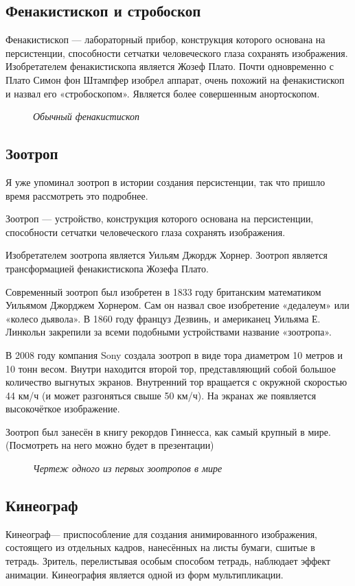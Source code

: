 \documentclass[a4paper, 12pt]{article}
\newcommand{\image}[3]{
	\begin{figure}[ht]
		\center{\texttt{[image: img/\#1]} }
		\caption{\textit{#3}}\end{figure}
}
\begin{document}
\subsection{Фенакистископ и стробоскоп}
Фенакистископ — лабораторный прибор, конструкция которого
основана на персистенции, способности сетчатки человеческого глаза
сохранять изображения. Изобретателем фенакистископа является Жозеф
Плато. Почти одновременно с Плато Симон фон Штампфер изобрел аппарат,
очень похожий на фенакистископ и назвал его «стробоскопом». Является
более совершенным анортоскопом.

\image{Фенакистископ.jpg}{172}{Обычный фенакистископ}

\subsection{Зоотроп}
Я уже упоминал зоотроп в истории создания персистенции, так что
пришло время рассмотреть это подробнее.

Зоотроп — устройство, конструкция которого основана на персистенции,
способности сетчатки человеческого глаза сохранять изображения.


Изобретателем зоотропа является Уильям Джордж Хорнер. Зоотроп является
трансформацией фенакистископа Жозефа Плато.


Современный зоотроп был изобретен в 1833 году британским математиком
Уильямом Джорджем Хорнером. Сам он назвал свое изобретение «дедалеум»
или «колесо дьявола». В 1860 году француз Дезвинь, и американец Уильяма Е.
Линкольн закрепили за всеми подобными устройствами название «зоотропа».


В 2008 году компания Sony создала зоотроп в виде тора диаметром 10 метров
и 10 тонн весом. Внутри находится второй тор, представляющий собой
большое количество выгнутых экранов. Внутренний тор вращается с
окружной скоростью 44 км/ч (и может разгоняться свыше 50 км/ч). На экранах
же появляется высокочёткое изображение.


Зоотроп был занесён в книгу рекордов Гиннесса, как самый крупный в мире.
(Посмотреть на него можно будет в презентации)

\image{зоотроп.jpg}{172}{Чертеж одного из первых зоотропов в мире}

\newpage

\subsection{Кинеограф}

Кинеограф— приспособление для создания анимированного
изображения, состоящего из отдельных кадров, нанесённых на листы бумаги,
сшитые в тетрадь. Зритель, перелистывая особым способом тетрадь,
наблюдает эффект анимации. Кинеография является одной из форм
мультипликации.
\end{document}
